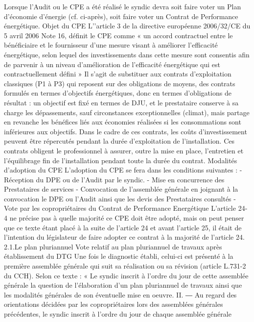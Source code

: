		Lorsque l’Audit ou le CPE a été réalisé le syndic devra soit faire voter un Plan d’économie d’énergie (cf. ci-après), soit faire voter un Contrat de Performance énergétique.
		Objet du CPE
		L’'article 3 de la directive européenne 2006/32/CE du 5 avril 2006 Note 16, définit le CPE comme « un accord contractuel entre le bénéficiaire et le fournisseur d'une mesure visant à améliorer l'efficacité énergétique, selon lequel des investissements dans cette mesure sont consentis afin de parvenir à un niveau d'amélioration de l'efficacité énergétique qui est contractuellement défini »
		Il s’agit de substituer aux contrats d’exploitation classiques (P1 à P3) qui reposent sur des obligations de moyens, des contrats formulés en termes d’objectifs énergétiques, donc en termes d’obligations de résultat : un objectif est fixé en termes de DJU, et le prestataire conserve à sa charge les dépassements, sauf circonstances exceptionnelles (climat), mais partage en revanche les bénéfices liés aux économies réalisées si les consommations sont inférieures aux objectifs.
		Dans le cadre de ces contrats, les coûts d’investissement peuvent être répercutés pendant la durée d’exploitation de l’installation. Ces contrats obligent le professionnel à assurer, outre la mise en place, l’entretien et l’équilibrage fin de l’installation pendant toute la durée du contrat.
		Modalités d’adoption du CPE
		L’adoption du CPE se fera dans les conditions suivantes :
		- Réception du DPE ou de l’Audit par le syndic.
		- Mise en concurrence des Prestataires de services
		- Convocation de l’assemblée générale en joignant à la convocation le DPE ou l’Audit ainsi que les devis des Prestataires consultés
		- Vote par les copropriétaires du Contrat de Performance Energétique
		L’article 24-4 ne précise pas à quelle majorité ce CPE doit être adopté, mais on peut penser que ce texte étant placé à la suite de l’article 24 et avant l’article 25, il était de l’intention du législateur de faire adopter ce contrat à la majorité de l’article 24.
		2.1.Le plan pluriannuel
		Vote relatif au plan pluriannuel de travaux après établissement du DTG
		Une fois le diagnostic établi, celui-ci est présenté à la première assemblée générale qui suit sa réalisation ou sa révision (article L.731-2 du CCH). Selon ce texte :
		« Le syndic inscrit à l'ordre du jour de cette assemblée générale la question de l'élaboration d'un plan pluriannuel de travaux ainsi que les modalités générales de son éventuelle mise en oeuvre.
		II. ― Au regard des orientations décidées par les copropriétaires lors des assemblées générales précédentes, le syndic inscrit à l'ordre du jour de chaque assemblée générale
